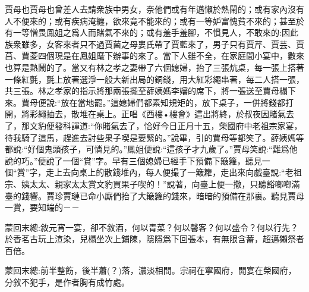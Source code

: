\begin{parag}
    賈母也賈母也曾差人去請衆族中男女，奈他們或有年邁懶於熱鬧的；或有家內沒有人不便來的；或有疾病淹纏，欲來竟不能來的；或有一等妒富愧貧不來的；甚至於有一等憎畏鳳姐之爲人而賭氣不來的；或有羞手羞腳，不慣見人，不敢來的:因此族衆雖多，女客來者只不過賈菌之母婁氏帶了賈藍來了，男子只有賈芹、賈芸、賈菖、賈菱四個現是在鳳姐麾下辦事的來了。當下人雖不全，在家庭間小宴中，數來也算是熱鬧的了。當又有林之孝之妻帶了六個媳婦，抬了三張炕桌，每一張上搭著一條紅氈，氈上放著選淨一般大新出局的銅錢，用大紅彩繩串著，每二人搭一張，共三張。林之孝家的指示將那兩張擺至薛姨媽李嬸的席下，將一張送至賈母榻下來。賈母便說:“放在當地罷。”這媳婦們都素知規矩的，放下桌子，一併將錢都打開，將彩繩抽去，散堆在桌上。正唱《西樓•樓會》這出將終，於叔夜因賭氣去了，那文豹便發科諢道:“你賭氣去了，恰好今日正月十五，榮國府中老祖宗家宴，待我騎了這馬，趕進去討些果子喫是要緊的。”說畢，引的賈母等都笑了。薛姨媽等都說:“好個鬼頭孩子，可憐見的。”鳳姐便說:“這孩子才九歲了。”賈母笑說:“難爲他說的巧。”便說了一個“賞”字。早有三個媳婦已經手下預備下簸籮，聽見一個“賞”字，走上去向桌上的散錢堆內，每人便撮了一簸籮，走出來向戲臺說:“老祖宗、姨太太、親家太太賞文豹買果子喫的！”說著，向臺上便一撒，只聽豁啷啷滿臺的錢響。賈珍賈璉已命小廝們抬了大簸籮的錢來，暗暗的預備在那裏。聽見賈母一賞，要知端的－－
\end{parag}


\begin{parag}
    \begin{note}蒙回末總:敘元宵一宴，卻不敘酒，何以青菜？何以馨客？何以盛令？何以行先？於香茗古玩上渲染，兒榻坐次上鋪陳，隱隱爲下回張本，有無限含蓄，超邁獺祭者百倍。\end{note}
\end{parag}


\begin{parag}
    \begin{note}蒙回末總:前半整飭，後半蕭(？)落，濃淡相間。宗祠在寧國府，開宴在榮國府，分敘不犯手，是作者胸有成竹處。\end{note}
\end{parag}
